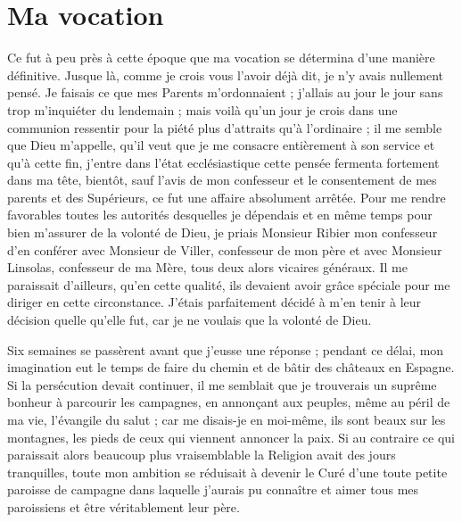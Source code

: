 \documentclass[11pt,a4paper]{report}
\begin{document}
\section*{Ma vocation}

Ce fut à peu près à cette époque que ma vocation se détermina d'une manière définitive. Jusque là, comme je crois vous l'avoir déjà dit, je n'y avais nullement pensé. Je faisais ce que mes Parents m'ordonnaient ; j'allais au jour le jour sans trop m'inquiéter du lendemain ; mais voilà qu'un jour je crois dans une communion ressentir pour la piété plus d'attraits qu'à l'ordinaire ; il me semble que Dieu m'appelle, qu'il veut que je me consacre entièrement à son service et qu'à cette fin, j'entre dans l'état ecclésiastique cette pensée fermenta fortement dans ma tête, bientôt, sauf l'avis de mon confesseur et le consentement de mes parents et des Supérieurs, ce fut une affaire absolument arrêtée. Pour me rendre favorables toutes les autorités desquelles je dépendais et en même temps pour bien m'assurer de la volonté de Dieu, je priais Monsieur Ribier mon confesseur d'en conférer avec Monsieur de Viller, confesseur de mon père et avec Monsieur Linsolas, confesseur de ma Mère, tous deux alors vicaires généraux. Il me paraissait d'ailleurs, qu'en cette qualité, ils devaient avoir grâce spéciale pour me diriger en cette circonstance. J'étais parfaitement décidé à m'en tenir à leur décision quelle qu'elle fut, car je ne voulais que la volonté de Dieu.

Six semaines se passèrent avant que j'eusse une réponse ; pendant ce délai, mon imagination eut le temps de faire du chemin et de bâtir des châteaux en Espagne. Si la persécution devait continuer, il me semblait que je trouverais un suprême bonheur à parcourir les campagnes, en annonçant aux peuples, même au péril de ma vie, l'évangile du salut ; car me disais-je en moi-même, ils sont beaux sur les montagnes, les pieds de ceux qui viennent annoncer la paix. Si au contraire ce qui paraissait alors beaucoup plus vraisemblable la Religion avait des jours tranquilles, toute mon ambition se réduisait à devenir le Curé d'une toute petite paroisse de campagne dans laquelle j'aurais pu connaître et aimer tous mes paroissiens et être véritablement leur père.
\end{document}
